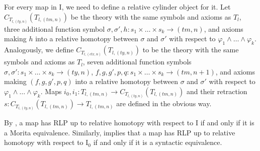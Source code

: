 \documentclass[reqno]{amsart}
\theoremstyle{definition}
\theoremstyle{remark}
\newcommand{\I}{\mathrm{I}}
\newcommand{\cyli}{i}
\numberwithin{figure}{section}
\begin{document}
For every map in $\I$, we need to define a relative cylinder object for it.
Let $C_{T_{l,(ty,n)}}(T_{l,(tm,n)})$ be the theory with the same symbols and axioms as $T_l$,
three additional function symbol $\sigma, \sigma', h : s_1 \times \ldots \times s_k \to (tm,n)$,
and axioms making $h$ into a relative homotopy between $\sigma$ and $\sigma'$ with respect to $\varphi_1 \land \ldots \land \varphi_k$.
Analogously, we define $C_{T_{l,(ctx,n)}}(T_{l,(ty,n)})$ to be the theory with the same symbols and axioms as $T_l$,
seven additional function symbols $\sigma,\sigma' : s_1 \times \ldots \times s_k \to (ty,n)$, $f,g,g',p,q : s_1 \times \ldots \times s_k \to (tm,n+1)$,
and axioms making $(f,g,g',p,q)$ into a relative homotopy between $\sigma$ and $\sigma'$ with respect to $\varphi_1 \land \ldots \land \varphi_k$.
Maps $\cyli_0,\cyli_1 : T_{l,(tm,n)} \to C_{T_{l,(ty,n)}}(T_{l,(tm,n)})$ and their retraction
$s : C_{T_{l,(ty,n)}}(T_{l,(tm,n)}) \to T_{l,(tm,n)}$ are defined in the obvious way.

\begin{remark}
By , a map has RLP up to relative homotopy with respect to $\I$ if and only if it is a Morita equivalence.
Similarly,  implies that a map has RLP up to relative homotopy with respect to $\I_0$ if and only if it is a syntactic equivalence.
\end{remark}
\end{document}
